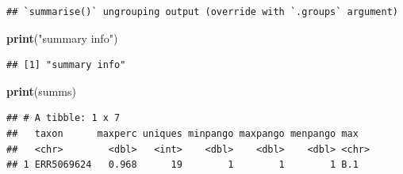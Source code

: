 \documentclass[]{article}
\newenvironment{Shaded}{\begin{snugshade}}{\end{snugshade}}
\newcommand{\DataTypeTok}[1]{\textcolor[rgb]{0.13,0.29,0.53}{#1}}
\newcommand{\DecValTok}[1]{\textcolor[rgb]{0.00,0.00,0.81}{#1}}
\newcommand{\KeywordTok}[1]{\textcolor[rgb]{0.13,0.29,0.53}{\textbf{#1}}}
\newcommand{\NormalTok}[1]{#1}
\newcommand{\OperatorTok}[1]{\textcolor[rgb]{0.81,0.36,0.00}{\textbf{#1}}}
\newcommand{\OtherTok}[1]{\textcolor[rgb]{0.56,0.35,0.01}{#1}}
\newcommand{\StringTok}[1]{\textcolor[rgb]{0.31,0.60,0.02}{#1}}
\begin{document}
\begin{Shaded}
\end{Shaded}

\begin{verbatim}
## `summarise()` ungrouping output (override with `.groups` argument)
\end{verbatim}

\begin{Shaded}
\begin{Highlighting}[]
\KeywordTok{print}\NormalTok{(}\StringTok{"summary info"}\NormalTok{)}
\end{Highlighting}
\end{Shaded}

\begin{verbatim}
## [1] "summary info"
\end{verbatim}

\begin{Shaded}
\begin{Highlighting}[]
\KeywordTok{print}\NormalTok{(summs)}
\end{Highlighting}
\end{Shaded}

\begin{verbatim}
## # A tibble: 1 x 7
##   taxon      maxperc uniques minpango maxpango menpango max  
##   <chr>        <dbl>   <int>    <dbl>    <dbl>    <dbl> <chr>
## 1 ERR5069624   0.968      19        1        1        1 B.1
\end{verbatim}
\end{document}
